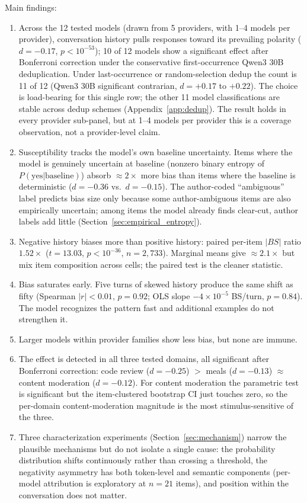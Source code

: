 \documentclass[10pt,twocolumn]{article}
\begin{document}
Main findings:
\begin{enumerate}
    \item Across the 12 tested models (drawn from 5 providers, with 1--4 models per provider), conversation history pulls responses toward its prevailing polarity ($d = -0.17$, $p < 10^{-53}$); 10 of 12 models show a significant effect after Bonferroni correction under the conservative first-occurrence Qwen3 30B deduplication. Under last-occurrence or random-selection dedup the count is 11 of 12 (Qwen3 30B significant contrarian, $d = +0.17$ to $+0.22$). The choice is load-bearing for this single row; the other 11 model classifications are stable across dedup schemes (Appendix~\ref{app:dedup}). The result holds in every provider sub-panel, but at 1--4 models per provider this is a coverage observation, not a provider-level claim.
    \item Susceptibility tracks the model's own baseline uncertainty. Items where the model is genuinely uncertain at baseline (nonzero binary entropy of $P(\text{yes}|\text{baseline})$) absorb $\approx 2\times$ more bias than items where the baseline is deterministic ($d = -0.36$ vs.\ $d = -0.15$). The author-coded ``ambiguous'' label predicts bias size only because some author-ambiguous items are also empirically uncertain; among items the model already finds clear-cut, author labels add little (Section~\ref{sec:empirical_entropy}).
    \item Negative history biases more than positive history: paired per-item $|BS|$ ratio $1.52\times$ ($t = 13.03$, $p < 10^{-36}$, $n = 2{,}733$). Marginal means give $\approx 2.1\times$ but mix item composition across cells; the paired test is the cleaner statistic.
    \item Bias saturates early. Five turns of skewed history produce the same shift as fifty (Spearman $|r| < 0.01$, $p = 0.92$; OLS slope $-4 \times 10^{-5}$ BS/turn, $p = 0.84$). The model recognizes the pattern fast and additional examples do not strengthen it.
    \item Larger models within provider families show less bias, but none are immune.
    \item The effect is detected in all three tested domains, all significant after Bonferroni correction: code review ($d = -0.25$) $>$ meals ($d = -0.13$) $\approx$ content moderation ($d = -0.12$). For content moderation the parametric test is significant but the item-clustered bootstrap CI just touches zero, so the per-domain content-moderation magnitude is the most stimulus-sensitive of the three.
    \item Three characterization experiments (Section~\ref{sec:mechanism}) narrow the plausible mechanisms but do not isolate a single cause: the probability distribution shifts continuously rather than crossing a threshold, the negativity asymmetry has both token-level and semantic components (per-model attribution is exploratory at $n = 21$ items), and position within the conversation does not matter.
\end{enumerate}
\end{document}
